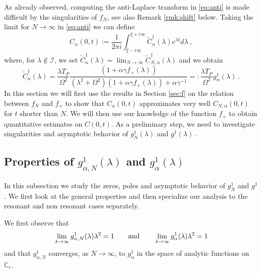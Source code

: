 \documentclass[11pt]{article}
\numberwithin{equation}{section}
\numberwithin{theorem}{section}
\newcommand{\matht}[1]{\texorpdfstring{#1}{}}
\def\tilde#1{\widetilde{#1}}
\begin{document}
As already observed, computing the anti-Laplace transform in \eqref{eq:anti} is made difficult by the singularities of
$f_N$, see also Remark \ref{rmk:shift} below. Taking the limit for $N\to\infty$ in \eqref{eq:anti} we can define
\begin{equation}\label{eq:antiinf}
 C_\alpha(0,t):=\frac{1}{2\pi
i}\int_{\xi-i\infty}^{\xi+i\infty}\tilde
C^1_\alpha(\lambda)e^{\lambda t}d\lambda\ ,
\end{equation}
where, for $\lambda\not\in\mathcal I$,  we set $\tilde C^1_\alpha(\lambda)=\lim_{N\to\infty}\tilde
C^1_{N,\alpha}(\lambda)$ and we obtain
\begin{equation}\label{eq:def_g_N}
\tilde C^1_\alpha(\lambda) = \frac{\lambda T_P}{\Omega^2}\frac{(1+\alpha\gamma
  f_+(\lambda))}{\left(\lambda^2+\Omega^2\right)\left(1+\alpha\gamma
f_+(\lambda)\right) + \alpha\gamma^{-1}}=:\frac{\lambda T_P}{\Omega^2}
g^1_\alpha(\lambda)\ .
\end{equation}
In this section we will first use the results in Section \ref{sec:f} on the relation between $f_N$ and $f_+$ to show
that $C_\alpha(0,t)$ approximates very well $C_{N,\alpha}(0,t)$ for $t$ shorter than $N$. We will then use our knowledge
of the function $f_+$ to obtain quantitative estimates on $C(0,t)$. As a preliminary step, we need to investigate
singularities and asymptotic behavior of $g^1_N(\lambda)$ and $g^1(\lambda)$ .



\subsection{Properties of \matht{$g^1_{\alpha,N}(\lambda)$} and
\matht{$g^1_\alpha(\lambda)$}}\label{subsec:galpha}

In this subsection we study the zeros, poles and asymptotic behavior of $g_N^1$ and $g^1$. We first look at the general
properties and then specialize our analysis to the resonant and non resonant cases separately.

We first observe that
\[
 \lim_{\lambda\to\infty} g^1_{\alpha,N}(\lambda)\lambda^2=1\qquad{\rm and}\qquad
  \lim_{\lambda\to\infty} g^1_\alpha(\lambda)\lambda^2=1
\]
and that $g^1_{\alpha,N}$ converges, as $N\to\infty$, to $g^1_\alpha$ in the space of analytic functions on
$\mathds{C}_r$.
\end{document}
